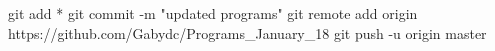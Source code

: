 git add *
git commit -m "updated programs"
git remote add origin https://github.com/Gabydc/Programs_January_18
git push -u origin master
